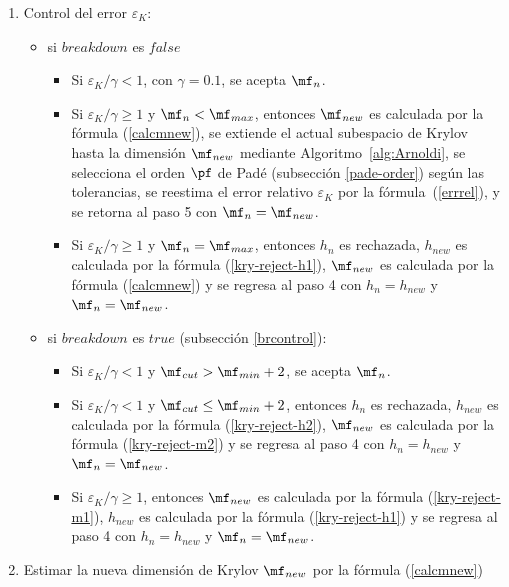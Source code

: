 \begin{enumerate}
    \item Control del error $\varepsilon_{K}$:
    \begin{itemize}
        \item si $breakdown$ es $false$
        \begin{itemize}
            \item Si $\varepsilon_{K}/\gamma< 1$, con $\gamma=0\mathord{.}1$, se acepta $\mf_n$.
            \item Si $\varepsilon_{K}/\gamma\geq 1$ y $\mf_n<\mf_{max}$,  entonces $\mf_{new}$ es calculada por la f\'ormula (\ref{calcmnew}), se extiende el actual subespacio de Krylov hasta la dimensión $\mf_{new}$ 
            mediante Algoritmo~\ref{alg:Arnoldi},
            se selecciona el orden $\pf$ de Pad\'e (subsección \ref{pade-order}) según las tolerancias, se reestima el error relativo $\varepsilon_{K}$ por la f\'ormula~(\ref{errrel}), y se retorna al paso 5 con $\mf_n=\mf_{new}$.
            \item Si $\varepsilon_{K}/\gamma\geq 1$ y $\mf_n=\mf_{max}$,  entonces $h_n$ es rechazada, $h_{new}$ es calculada por la fórmula (\ref{kry-reject-h1}), $\mf_{new}$ es calculada por la 
            fórmula (\ref{calcmnew}) y se regresa al paso 4 con $h_n=h_{new}$ y $\mf_n=\mf_{new}$.
        \end{itemize}
         \item si $breakdown$ es $true$ (subsección \ref{brcontrol}):
        \begin{itemize}
            \item Si $\varepsilon_{K}/\gamma< 1$ y $\mf_{cut}> \mf_{min}+2$,  se acepta $\mf_n$.
            
            \item Si $\varepsilon_{K}/\gamma< 1$ y $\mf_{cut}\leq \mf_{min}+2$, entonces $h_n$ es rechazada, $h_{new}$ es calculada por la fórmula (\ref{kry-reject-h2}), $\mf_{new}$ es calculada por la 
            fórmula (\ref{kry-reject-m2}) y se regresa al paso 4 con $h_n=h_{new}$ y $\mf_n=\mf_{new}$.
            
            \item Si $\varepsilon_{K}/\gamma\geq 1$, entonces $\mf_{new}$ es calculada por la f\'ormula (\ref{kry-reject-m1}), $h_{new}$ es calculada por la fórmula (\ref{kry-reject-h1})
            y se regresa al paso 4 con $h_n=h_{new}$ y $\mf_n=\mf_{new}$.
        \end{itemize}
    \end{itemize}


    \item Estimar la  nueva dimensión de Krylov $\mf_{new}$ por la fórmula (\ref{calcmnew})


\end{enumerate}
